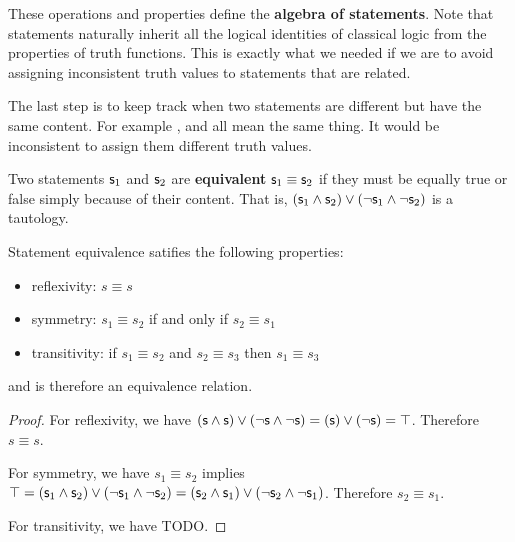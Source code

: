 \documentclass[11pt,letterpaper,fleqn]{memoir} %
\begin{document}
These operations and properties define the \textbf{algebra of statements}. Note that statements naturally inherit all the logical identities of classical logic from the properties of truth functions. This is exactly what we needed if we are to avoid assigning inconsistent truth values to statements that are related. 

The last step is to keep track when two statements are different but have the same content. For example ,  and  all mean the same thing. It would be inconsistent to assign them different truth values.

\begin{mathSection}

\begin{defn}
	Two statements $\mathsf{s}_1$ and $\mathsf{s}_2$ are \textbf{equivalent} $\mathsf{s}_1 \equiv \mathsf{s}_2$ if they must be equally true or false simply because of their content. That is, $(\mathsf{s}_1 \wedge \mathsf{s}_2) \vee (\neg\mathsf{s}_1 \wedge \neg\mathsf{s}_2)$ is a tautology.
\end{defn}

\begin{prop}
	Statement equivalence satifies the following properties:
	\begin{itemize}
		\item reflexivity: $s \equiv s$
		\item symmetry: $s_1 \equiv s_2$ if and only if $s_2 \equiv s_1$
		\item transitivity: if $s_1 \equiv s_2$ and $s_2 \equiv s_3$ then $s_1 \equiv s_3$
	\end{itemize}
	and is therefore an equivalence relation.
\end{prop}
\begin{proof}
	For reflexivity, we have $(\mathsf{s} \wedge \mathsf{s}) \vee (\neg\mathsf{s} \wedge \neg\mathsf{s}) = (\mathsf{s}) \vee (\neg\mathsf{s}) = \top$. Therefore $s \equiv s$.
	
	For symmetry, we have $s_1 \equiv s_2$ implies $\top = (\mathsf{s}_1 \wedge \mathsf{s}_2) \vee (\neg\mathsf{s}_1 \wedge \neg\mathsf{s}_2) = (\mathsf{s}_2 \wedge \mathsf{s}_1) \vee (\neg\mathsf{s}_2 \wedge \neg\mathsf{s}_1)$. Therefore $s_2 \equiv s_1$.
	
	For transitivity, we have TODO.
\end{proof}

\end{mathSection}
\end{document}
